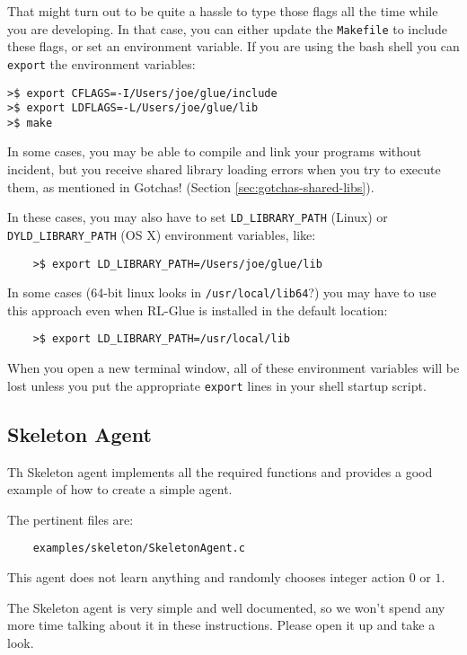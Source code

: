 \documentclass[11pt]{article}
\begin{document}
That might turn out to be quite a hassle to type those flags all the time while you are developing.  In that case, you can either update the \texttt{Makefile} to include these flags, 
or set an environment variable.  If you are using the bash shell you can \texttt{export} the environment variables:
\begin{verbatim}
>$ export CFLAGS=-I/Users/joe/glue/include
>$ export LDFLAGS=-L/Users/joe/glue/lib
>$ make
\end{verbatim}

In some cases, you may be able to compile and link your programs without incident, but you receive shared library loading errors when you try to execute them, as mentioned in Gotchas! (Section \ref{sec:gotchas-shared-libs}).

In these cases, you may also have to set \texttt{LD\_LIBRARY\_PATH} (Linux) or \texttt{DYLD\_LIBRARY\_PATH} (OS X) environment variables, like:
\begin{verbatim}
	>$ export LD_LIBRARY_PATH=/Users/joe/glue/lib
\end{verbatim}

In some cases (64-bit linux looks in \texttt{/usr/local/lib64}?) you may have to use this approach even when RL-Glue is installed in the default location:
\begin{verbatim}
	>$ export LD_LIBRARY_PATH=/usr/local/lib
\end{verbatim}

When you open a new terminal window, all of these environment variables will be lost unless you put the appropriate \texttt{export} lines in your shell startup script.


\subsection{Skeleton Agent}
\label{sec:agent}
Th Skeleton agent implements all the required functions and provides a good example of how to create a simple agent.

The pertinent files are:
\begin{verbatim}
	examples/skeleton/SkeletonAgent.c
\end{verbatim}

This agent does not learn anything and randomly chooses integer action $0$ or $1$.

The Skeleton agent is very simple and well documented, so we won't spend any more time talking about it in these instructions.
Please open it up and take a look.
\end{document}
